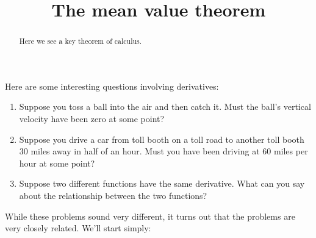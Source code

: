 \documentclass{ximera}
\title[Dig-In:]{The mean value theorem}
\begin{document}
\begin{abstract}
  Here we see a key theorem of calculus.
\end{abstract}
\maketitle


Here are some interesting questions involving derivatives:

\begin{enumerate}
\item Suppose you toss a ball into the air and then catch it. Must the
  ball's vertical velocity have been zero at some point?
\item Suppose you drive a car from toll booth on a toll road to
  another toll booth $30$ miles away in half of an hour. Must you have
  been driving at $60$ miles per hour at some point?
\item Suppose two different functions have the same derivative. What
  can you say about the relationship between the two functions?
\end{enumerate}

While these problems sound very different, it turns out that the
problems are very closely related. We'll start simply:
\end{document}
